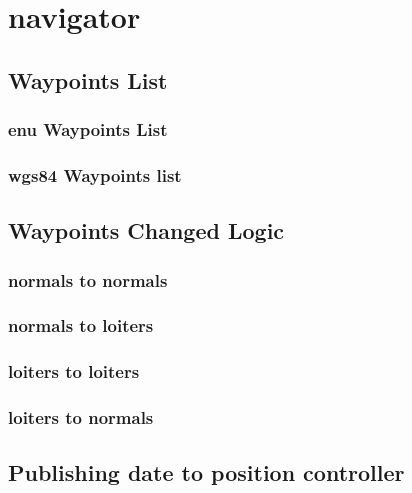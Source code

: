 \chapter{navigator}

\section{Waypoints List}

\subsection{enu Waypoints List}

\clearpage
\subsection{wgs84 Waypoints list}
\clearpage

\section{Waypoints Changed Logic}

\subsection{normals to normals}
\clearpage

\subsection{normals to loiters}
\clearpage
\subsection{loiters to loiters}
\clearpage

\subsection{loiters to normals}
\clearpage

\section{Publishing date to position controller}
\clearpage

